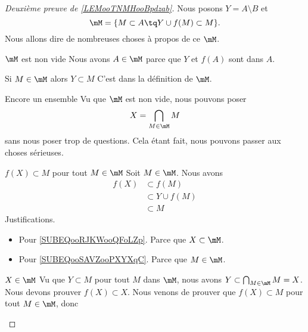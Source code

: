 \begin{proof}[Deuxième preuve de \ref{LEMooTNMHooBpdzab}\cite{BIBooZFPUooIiywbk}]
    Nous posons \( Y=A\setminus B\) et
    \begin{equation}
        \mM=\{ M\subset A\tq Y\cup f(M)\subset M \}.
    \end{equation}
    Nous allons dire de nombreuses choses à propos de ce \( \mM\).
    \begin{subproof}
        \item[\( \mM\) est non vide]
            Nous avons \( A\in \mM\) parce que \( Y\) et \( f(A)\) sont dans \( A\).
        \item[Si \( M\in\mM\) alors \( Y\subset M\)]
            C'est dans la définition de \( \mM\).
        \item[Encore un ensemble]
            Vu que \( \mM\) est non vide, nous pouvons poser
            \begin{equation}
                X=\bigcap_{M\in \mM}M
            \end{equation}
            sans nous poser trop de questions. Cela étant fait, nous pouvons passer aux choses sérieuses.
        \item[\( f(X)\subset M\) pour tout \( M\in \mM\)]
            Soit \( M\in \mM\). Nous avons
            \begin{subequations}
                \begin{align}
                    f(X)&\subset f(M)       \label{SUBEQooRJKWooQFoLZp}\\
                    &\subset Y\cup f(M)\\
                    &\subset M              \label{SUBEQooSAVZooPXYXqC}
                \end{align}
            \end{subequations}
            Justifications.
            \begin{itemize}
                \item Pour \eqref{SUBEQooRJKWooQFoLZp}. Parce que \( X\subset \mM\).
                \item Pour \eqref{SUBEQooSAVZooPXYXqC}. Parce que \( M\in \mM\).
            \end{itemize}
        \item[\( X\in\mM\)]
            Vu que \( Y\subset M\) pour tout \( M\) dans \( \mM\), nous avons \( Y\subset \bigcap_{M\in \mM}M=X\). Nous devons prouver \( f(X)\subset X\). Nous venons de prouver que \( f(X)\subset M\) pour tout \( M\in \mM\), donc
            \begin{equation}

\end{equation}
\end{subproof}
\end{proof}

